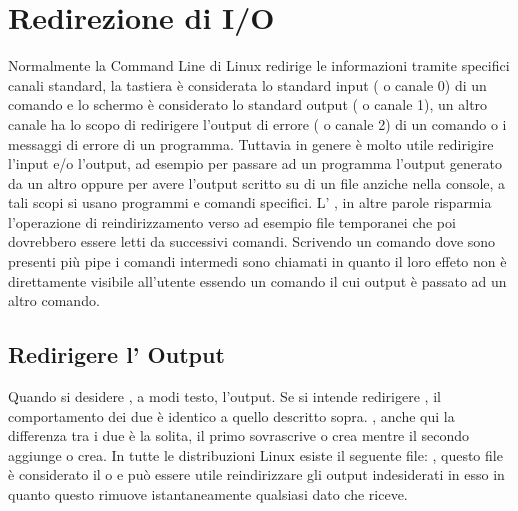 \section{Redirezione di I/O}
\label{Redirezione-di-I/O}
Normalmente la Command Line di Linux redirige le informazioni tramite specifici canali standard, la tastiera è considerata lo standard input ( o canale 0) di un comando e lo schermo è considerato lo standard output ( o canale 1), un altro canale ha lo scopo di redirigere l'output di errore ( o canale 2) di un comando o i messaggi di errore di un programma. Tuttavia in genere è molto utile redirigire l'input e/o l'output, ad esempio per passare ad un programma l'output generato da un altro oppure per avere l'output scritto su di un file anziche nella console, a tali scopi si usano programmi e comandi specifici. L' , in altre parole risparmia l'operazione di reindirizzamento verso ad esempio file temporanei che poi dovrebbero essere letti da successivi comandi. Scrivendo un comando dove sono presenti più pipe i comandi intermedi sono chiamati  in quanto il loro effeto non è direttamente visibile all'utente essendo un comando il cui output è passato ad un altro comando.

\subsection{Redirigere l' Output}
\label{subsec:Redirigere-l-Output}
Quando si desidere , a modi testo, l'output. Se si intende redirigere , il comportamento dei due è identico a quello descritto sopra. , anche qui la differenza tra i due è la solita, il primo sovrascrive o crea mentre il secondo aggiunge o crea. In tutte le distribuzioni Linux esiste il seguente file: , questo file è considerato il  o  e può essere utile reindirizzare gli output indesiderati in esso in quanto questo rimuove istantaneamente qualsiasi dato che riceve.

